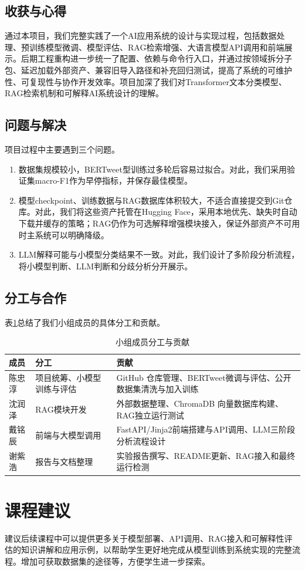 \documentclass[10pt]{article}
\begin{document}
\subsection{收获与心得}
通过本项目，我们完整实践了一个AI应用系统的设计与实现过程，包括数据处理、预训练模型微调、模型评估、RAG检索增强、大语言模型API调用和前端展示。后期工程重构进一步统一了配置、依赖与命令行入口，并通过按领域拆分子包、延迟加载外部资产、兼容旧导入路径和补充回归测试，提高了系统的可维护性、可复现性与协作开发效率。项目加深了我们对Transformer文本分类模型、RAG检索机制和可解释AI系统设计的理解。

\subsection{问题与解决}
项目过程中主要遇到三个问题。
\begin{enumerate}
    \item 数据集规模较小，BERTweet型训练过多轮后容易过拟合。对此，我们采用验证集macro-F1作为早停指标，并保存最佳模型。
    \item 模型checkpoint、训练数据与RAG数据库体积较大，不适合直接提交到Git仓库。对此，我们将这些资产托管在Hugging Face，采用本地优先、缺失时自动下载并缓存的策略；RAG仍作为可选解释增强模块接入，保证外部资产不可用时主系统可以明确降级。
    \item LLM解释可能与小模型分类结果不一致。对此，我们设计了多阶段分析流程，将小模型判断、LLM判断和分歧分析分开展示。
\end{enumerate}

\subsection{分工与合作}
表\ref{tab:contributions}总结了我们小组成员的具体分工和贡献。

\begin{table}[H]
    \centering
    \begin{tabular}{|l|l|l|}
        \hline
        \textbf{成员} & \textbf{分工} & \textbf{贡献} \\
        \hline
        陈忠淳 & 项目统筹、小模型训练与评估 & GitHub 仓库管理、BERTweet微调与评估、公开数据集清洗与加入训练 \\
        沈润泽 & RAG模块开发 & 外部数据整理、ChromaDB 向量数据库构建、RAG独立运行测试 \\
        戴铭辰 & 前端与大模型调用 & FastAPI/Jinja2前端搭建与API调用、LLM三阶段分析流程设计 \\
        谢紫浩 & 报告与文档整理 & 实验报告撰写、README更新、RAG接入和最终运行检测\\
        \hline
    \end{tabular}
    \caption{小组成员分工与贡献}
    \label{tab:contributions}
\end{table}

\section{课程建议}
建议后续课程中可以提供更多关于模型部署、API调用、RAG接入和可解释性评估的知识讲解和应用示例，以帮助学生更好地完成从模型训练到系统实现的完整流程。增加可获取数据集的途径等，方便学生进一步探索。
\end{document}
